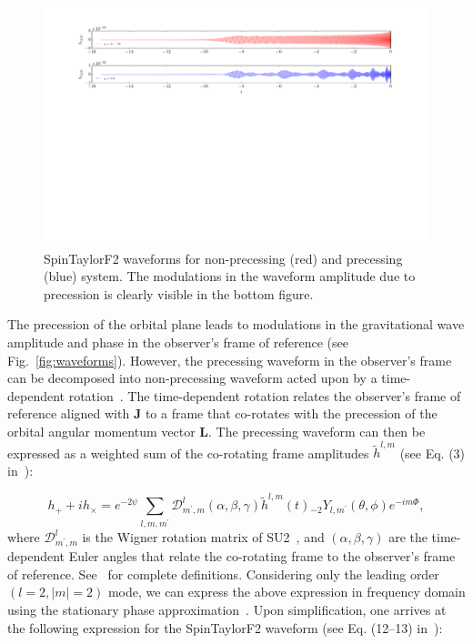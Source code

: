 \label{fig:waveforms} 
\begin{figure}[t]
\includegraphics[width=\textwidth]{./images/TD_waveforms_comparison.pdf}
\caption{SpinTaylorF2 waveforms for non-precessing (red) and precessing (blue) system. 
The modulations in the waveform amplitude due to precession is clearly visible in the 
bottom figure.} 
\centering 
\end{figure}

The precession of the orbital plane leads to modulations in the gravitational
wave amplitude and phase in the observer's frame of reference (see Fig.~\ref{fig:waveforms}).
However, the precessing waveform in the observer's frame can be decomposed into
non-precessing waveform acted upon by a time-dependent rotation~\cite{Boyle2011,
Rotation}. The time-dependent rotation relates the observer's frame of reference
aligned with $\mathbf{J}$ to a frame that co-rotates with the precession of the
orbital angular momentum vector $\mathbf{L}$. The precessing waveform can then
be expressed as a weighted sum of the co-rotating frame amplitudes
$\tilde{h}^{l,m}$ (see Eq. (3) in~\cite{Lundgren2014}):

\begin{equation}   
h_{+} + i h_{\times} = e^{-2 \psi}
\sum_{l,m,m^{\prime}} \mathcal{D}^{l}_{m^{\prime},m} \left(\alpha, \beta, \gamma\right)
\tilde{h}^{l,m}(t){}_{-2}Y_{l,m^{\prime}}\left(\theta,\phi\right)e^{-i m \Phi},
\end{equation}   
where $\mathcal{D}^{l}_{m^{\prime},m}$ is the Wigner rotation matrix of
SU2~\cite{Boyle2011}, and $(\alpha, \beta, \gamma)$ are the time- dependent
Euler angles that relate the co-rotating frame to the observer's frame of
reference. See~\cite{Lundgren2014} for complete definitions. Considering only
the leading order $(l=2, |m| = 2)$ mode, we can express the above expression in
frequency domain using the stationary phase approximation~\cite{Lundgren2014,
Creighton}.  Upon simplification, one arrives at the following expression for
the SpinTaylorF2 waveform (see Eq. (12--13) in~\cite{Lundgren2014}):

